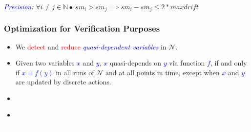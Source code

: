 \documentclass[serif]{beamer}
\begin{document}
\begin{frame}

\emph{\textcolor{blue}{Precision}: $\forall i\neq j\in\mathbb{N}\bullet \ sm_i > sm_j \implies sm_i-sm_j \leq 2*\mathit{maxdrift}$} 
\end{frame}


\begin{frame}\frametitle{\textbf{Optimization for Verification Purposes}}
\begin{itemize}
	\item We \textcolor{red}{detect} and \textcolor{red}{reduce} 
				\emph{\textcolor{blue}{quasi-dependent variables}} in $\mathcal{N}$.
	\item Given two variables \textcolor{blue}{$x$} and \textcolor{blue}{$y$}, \textcolor{blue}{$x$} quasi-depends
on \textcolor{blue}{$y$} via function \textcolor{blue}{$f$}, if and only if \textcolor{blue}{$x=f(y)$} in all 
runs of $\mathcal{N}$ and at all points in time, except when \textcolor{blue}{$x$} and \textcolor{blue}{$y$} are updated by discrete actions.
	\item[] \textcolor{white}{We obtain equivalence classes of quasi-dependent variables.} 
	\item[] \textcolor{white}{We use only the representative clock of each class in a 
				\textcolor{white}{transformed network} which satisfies the same properties as
				the original network.}
\end{itemize}
\end{frame} 
\end{document}
